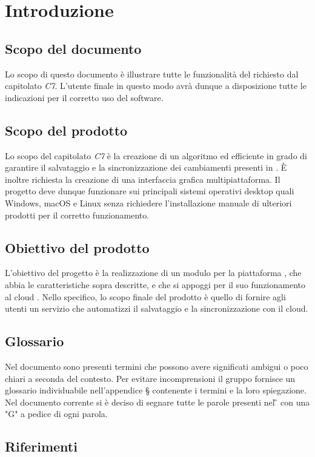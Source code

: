 \section{Introduzione}
\subsection{Scopo del documento}
Lo scopo di questo documento è illustrare tutte le funzionalità del  richiesto dal capitolato \textit{C7}. L'utente finale in questo modo avrà dunque a disposizione tutte le indicazioni per il corretto uso del software.

\subsection{Scopo del prodotto}
Lo scopo del capitolato \textit{C7} è la creazione di un algoritmo  ed efficiente in grado di garantire il salvataggio e la sincronizzazione dei cambiamenti presenti in . È inoltre richiesta la creazione di una interfaccia grafica multipiattaforma. Il progetto deve dunque funzionare sui principali sistemi operativi desktop quali Windows, macOS e Linux senza richiedere l'installazione manuale di ulteriori prodotti per il corretto funzionamento. 
\subsection{Obiettivo del prodotto}
L'obiettivo del progetto è la realizzazione di un modulo per la piattaforma , che abbia le caratteristiche sopra descritte, e che si appoggi per il suo funzionamento al cloud .
Nello specifico, lo scopo finale del prodotto è quello di fornire agli utenti un servizio che automatizzi il salvataggio e la sincronizzazione con il cloud.

\subsection{Glossario}
Nel documento sono presenti termini che possono avere significati ambigui o poco chiari a seconda del contesto. Per evitare incomprensioni il gruppo fornisce un glossario individuabile nell'appendice \S{} contenente i termini e la loro spiegazione.\newline{}
Nel documento corrente si è deciso di segnare tutte le parole presenti nel \G{} con una "G" a pedice di ogni parola.
\subsection{Riferimenti}
